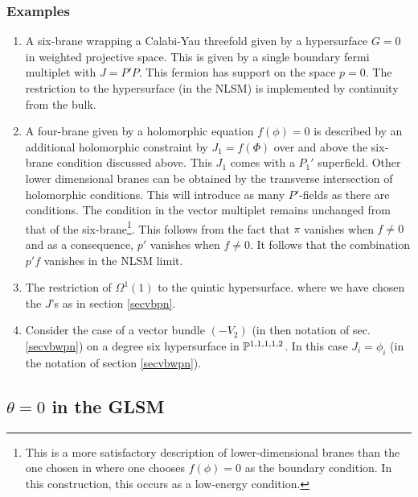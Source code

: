 \documentclass[a4paper,12pt]{article}
\begin{document}
\subsubsection{Examples}
\begin{enumerate}
\item A six-brane wrapping a Calabi-Yau threefold given by
a hypersurface $G=0$ in weighted projective space. This is given by
a single boundary fermi multiplet with $J=P' P$.  This fermion
has support on the space $p=0$. The restriction to the hypersurface (in
the NLSM) is implemented by continuity from the bulk.
\item A four-brane given by a holomorphic equation
$f(\phi)=0$ is described by an additional holomorphic constraint 
by  $J_1=f(\Phi)$ over and above the six-brane condition
discussed above. This $J_1$ comes with a $P_1'$ superfield.
Other lower dimensional branes can be obtained by the transverse
intersection of holomorphic conditions. This will introduce
as many $P'$-fields as there are conditions. 
The condition in
the vector multiplet remains unchanged from that of the
six-brane\footnote{This is a more satisfactory description of
lower-dimensional branes than the one chosen in \cite{lsmone}
where one chooses $f(\phi)=0$ as the boundary condition. In
this construction, this occurs as a low-energy condition.}.
This follows from the fact that $\pi$ vanishes when $f\neq0$ 
and as a consequence, $p'$ vanishes when $f\neq0$. It follows
that the combination $p'f$ vanishes in the NLSM limit.
\item  The restriction of $\Omega^1(1)$ to the quintic hypersurface.
where we have chosen the $J$'s as in section \ref{secvbpn}.
\item Consider the case of a vector bundle $(-V_2)$ (in then notation of
sec. \ref{secvbwpn}) on a degree six hypersurface
in $\mathbb P^{1,1,1,1,2}$.  
In this case $J_i=\phi_i$ (in the notation of section  \ref{secvbwpn}). 
\end{enumerate}

\subsection{$\theta=0$ in the GLSM}
\end{document}
